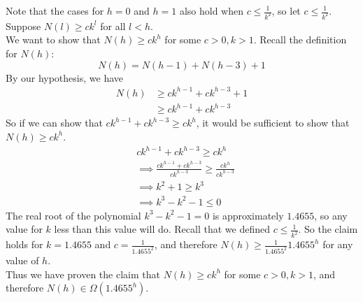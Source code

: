 \documentclass{article}
\begin{document}
	Note that the cases for $h=0$ and $h=1$ also hold when $c\le\frac{1}{k^2}$, so let $c\le\frac{1}{k^2}$.\\
	Suppose $N(l)\ge{ck^l}$ for all $l<h$.\\
	We want to show that $N(h)\ge{ck^h}$ for some $c>0,k>1$. Recall the definition for $N(h)$:
	\[N(h)=N(h-1)+N(h-3)+1\]
	By our hypothesis, we have
	\begin{align*}
		N(h)&\ge{ck^{h-1}+ck^{h-3}+1}\\
		&\ge{ck^{h-1}+ck^{h-3}}
	\end{align*}
	So if we can show that $ck^{h-1}+ck^{h-3}\ge{ck^h}$, it would be sufficient to show that $N(h)\ge{ck^h}$.
	\begin{align*}
		&ck^{h-1}+ck^{h-3}\ge{ck^h}\\
		&\implies{\frac{ck^{h-1}+ck^{h-3}}{ck^{h-3}}\ge{\frac{ck^h}{ck^{h-3}}}}\\
		&\implies{k^2+1\ge{k^3}}\\
		&\implies{k^3-k^2-1\le{0}}
	\end{align*}
	The real root of the polynomial $k^3-k^2-1=0$ is approximately $1.4655$, so any value for $k$ less than this
	value will do. Recall that we defined $c\le\frac{1}{k^2}$. So the claim holds for $k=1.4655$ and $c=\frac{1}{1.4655^2}$,
	and therefore $N(h)\ge{\frac{1}{1.4655^2}1.4655^{h}}$ for any value of $h$.\\
	Thus we have proven the claim that $N(h)\ge{ck^h}$ for some $c>0,k>1$, and therefore $N(h)\in\Omega{(1.4655^h)}$.
\end{document}
